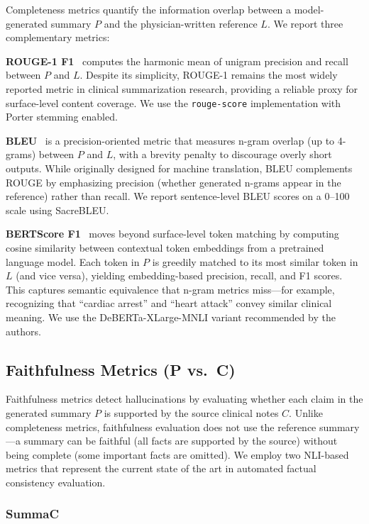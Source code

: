 \documentclass[12pt,a4paper,oneside]{report}
\begin{document}
Completeness metrics quantify the information overlap between a model-generated summary $P$ and the physician-written reference $L$. We report three complementary metrics:

\textbf{ROUGE-1 F1}~\cite{lin2004rouge} computes the harmonic mean of unigram precision and recall between $P$ and $L$. Despite its simplicity, ROUGE-1 remains the most widely reported metric in clinical summarization research, providing a reliable proxy for surface-level content coverage. We use the \texttt{rouge-score} implementation with Porter stemming enabled.

\textbf{BLEU}~\cite{papineni2002bleu} is a precision-oriented metric that measures n-gram overlap (up to 4-grams) between $P$ and $L$, with a brevity penalty to discourage overly short outputs. While originally designed for machine translation, BLEU complements ROUGE by emphasizing precision (whether generated n-grams appear in the reference) rather than recall. We report sentence-level BLEU scores on a 0--100 scale using SacreBLEU.

\textbf{BERTScore F1}~\cite{zhang2020bertscore} moves beyond surface-level token matching by computing cosine similarity between contextual token embeddings from a pretrained language model. Each token in $P$ is greedily matched to its most similar token in $L$ (and vice versa), yielding embedding-based precision, recall, and F1 scores. This captures semantic equivalence that n-gram metrics miss---for example, recognizing that ``cardiac arrest'' and ``heart attack'' convey similar clinical meaning. We use the DeBERTa-XLarge-MNLI variant recommended by the authors.

\subsection{Faithfulness Metrics (P vs.\ C)}
\label{subsec:faithfulness}

Faithfulness metrics detect hallucinations by evaluating whether each claim in the generated summary $P$ is supported by the source clinical notes $C$. Unlike completeness metrics, faithfulness evaluation does not use the reference summary---a summary can be faithful (all facts are supported by the source) without being complete (some important facts are omitted). We employ two NLI-based metrics that represent the current state of the art in automated factual consistency evaluation.

\subsubsection{SummaC}
\end{document}
